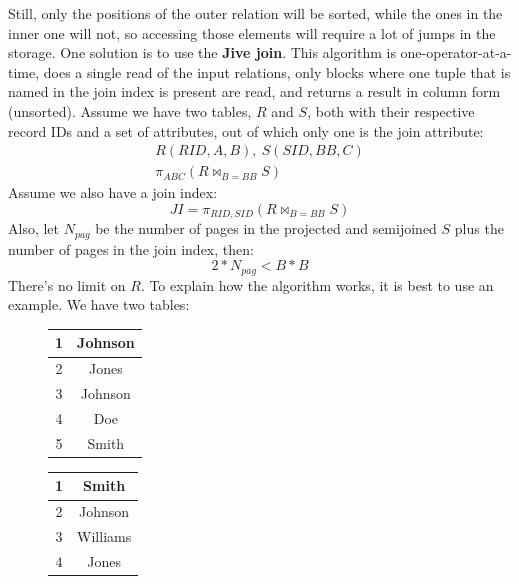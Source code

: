 Still, only the positions of the outer relation will be sorted, while the ones in the inner one will not, so accessing those elements will require a lot of jumps in the storage. One solution is to use the \textbf{Jive join}. This algorithm is one-operator-at-a-time, does a single read of the input relations, only blocks where one tuple that is named in the join index is present are read, and returns a result in column form (unsorted). Assume we have two tables, $R$ and $S$, both with their respective record IDs and a set of attributes, out of which only one is the join attribute:
\begin{gather*}
    R(RID, A, B), \ S(SID, BB, C) \\
    \pi_{ABC}(R \bowtie_{B=BB} S) 
\end{gather*}
Assume we also have a join index:
\begin{equation*}
    JI = \pi_{RID, SID} (R \bowtie_{B=BB} S)
\end{equation*}
Also, let $N_{pag}$ be the number of pages in the projected and semijoined $S$ plus the number of pages in the join index, then:
\begin{equation*}
    2*N_{pag} < B*B
\end{equation*}
There's no limit on $R$. To explain how the algorithm works, it is best to use an example. We have two tables:
\begin{figure}[H]
\centering
    \begin{minipage}{0.49\textwidth}
    \centering
        \begin{tabular}{|c|c|}
        \hline
            1 & Johnson \\
        \hline
            2 & Jones \\
        \hline
            3 & Johnson \\
        \hline
            4 & Doe \\
        \hline
            5 & Smith \\
        \hline
        \end{tabular}
    \end{minipage}
    \hfill
    \begin{minipage}{0.49\textwidth}
    \centering
        \begin{tabular}{|c|c|}
        \hline
            1 & Smith \\
        \hline
            2 & Johnson \\
        \hline
            3 & Williams \\
        \hline
            4 & Jones \\
        \hline
        \end{tabular}
    \end{minipage}
\end{figure}
